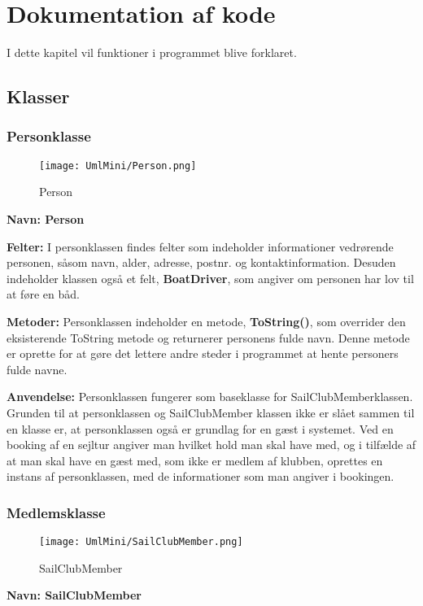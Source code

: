 \chapter{Dokumentation af kode} \label{chap:kode_docs}
I dette kapitel vil funktioner i programmet blive forklaret.

\section{Klasser}
\subsection*{Personklasse}
\begin{wrapfigure}{l}{0.4\textwidth}
    \label{img:Person}
    \vspace{-20pt}
    \begin{center}
        \texttt{[image: UmlMini/Person.png]}
    \end{center}
    \vspace{-20pt}
    \caption{Person}
    \vspace{-10pt}
\end{wrapfigure}
\textbf{Navn: Person}

\textbf{Felter:}
I personklassen findes felter som indeholder informationer vedrørende personen, såsom navn, alder, adresse, postnr. og kontaktinformation. 
Desuden indeholder klassen også et felt, \textbf{BoatDriver}, som angiver om personen har lov til at føre en båd. 

\textbf{Metoder:}
Personklassen indeholder en metode, \textbf{ToString()}, som overrider den eksisterende ToString metode og returnerer personens fulde navn. 
Denne metode er oprette for at gøre det lettere andre steder i programmet at hente personers fulde navne.

\textbf{Anvendelse:}
Personklassen fungerer som baseklasse for SailClubMemberklassen. Grunden til at personklassen og SailClubMember klassen ikke er slået sammen til en klasse er, at personklassen også er grundlag for en gæst i systemet. 
Ved en booking af en sejltur angiver man hvilket hold man skal have med, og i tilfælde af at man skal have en gæst med, som ikke er medlem af klubben, oprettes en instans af personklassen, med de informationer som man angiver i bookingen.

\subsection*{Medlemsklasse}
\begin{wrapfigure}{l}{0.5\textwidth}
    \label{img:SailClubMember}
    \vspace{-20pt}
    \begin{center}
        \texttt{[image: UmlMini/SailClubMember.png]}
    \end{center}
    \vspace{-20pt}
    \caption{SailClubMember}
    \vspace{-10pt}
\end{wrapfigure}
\textbf{Navn: SailClubMember}

